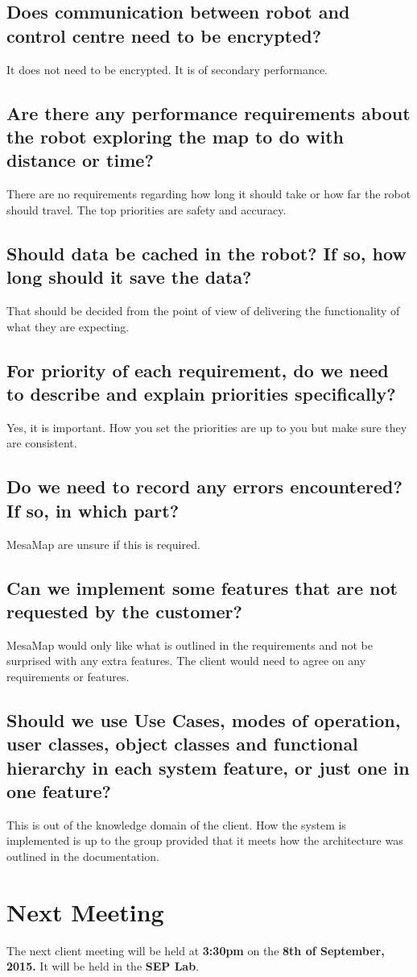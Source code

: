 \documentclass[a4paper]{article}
\begin{document}
\subsection{Does communication between robot and control centre need to be encrypted?}
It does not need to be encrypted. It is of secondary performance.

\subsection{Are there any performance requirements about the robot exploring the map to do with distance or time?}
There are no requirements regarding how long it should take or how far the robot should travel. The top priorities are safety and accuracy.

\subsection{Should data be cached in the robot? If so, how long should it save the data?}
That should be decided from the point of view of delivering the functionality of what they are expecting.

\subsection{For priority of each requirement, do we need to describe and explain priorities specifically?}
Yes, it is important. How you set the priorities are up to you but make sure they are consistent.

\subsection{Do we need to record any errors encountered? If so, in which part?}
MesaMap are unsure if this is required.

\subsection{Can we implement some features that are not requested by the customer?}
MesaMap would only like what is outlined in the requirements and not be surprised with any extra features. The client would need to agree on any requirements or features.

\subsection{Should we use Use Cases, modes of operation, user classes, object classes and functional hierarchy in each system feature, or just one in one feature?}
This is out of the knowledge domain of the client. How the system is implemented is up to the group provided that it meets how the architecture was outlined in the documentation.

\section{Next Meeting}
The next client meeting will be held at \textbf{3:30pm} on the \textbf{8th of September, 2015.} It will be held in the \textbf{SEP Lab}.
\end{document}

